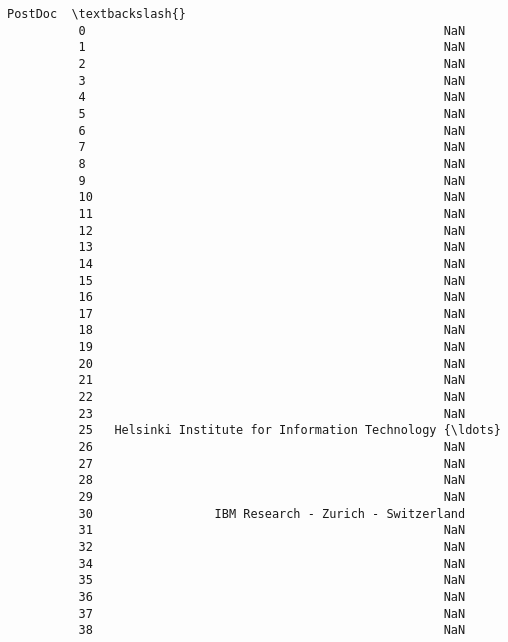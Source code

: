 \documentclass[11pt]{article}
\begin{document}
\begin{Verbatim}[commandchars=\\\{\}]
                                                         PostDoc  \textbackslash{}
          0                                                  NaN   
          1                                                  NaN   
          2                                                  NaN   
          3                                                  NaN   
          4                                                  NaN   
          5                                                  NaN   
          6                                                  NaN   
          7                                                  NaN   
          8                                                  NaN   
          9                                                  NaN   
          10                                                 NaN   
          11                                                 NaN   
          12                                                 NaN   
          13                                                 NaN   
          14                                                 NaN   
          15                                                 NaN   
          16                                                 NaN   
          17                                                 NaN   
          18                                                 NaN   
          19                                                 NaN   
          20                                                 NaN   
          21                                                 NaN   
          22                                                 NaN   
          23                                                 NaN   
          25   Helsinki Institute for Information Technology {\ldots}   
          26                                                 NaN   
          27                                                 NaN   
          28                                                 NaN   
          29                                                 NaN   
          30                 IBM Research - Zurich - Switzerland   
          31                                                 NaN   
          32                                                 NaN   
          34                                                 NaN   
          35                                                 NaN   
          36                                                 NaN   
          37                                                 NaN   
          38                                                 NaN   

\end{Verbatim}
\end{document}
